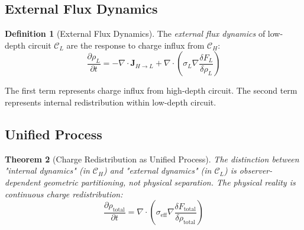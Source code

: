 \documentclass[12pt,a4paper]{article}
\theoremstyle{plain}
\newtheorem{theorem}{Theorem}[section]
\theoremstyle{definition}
\newtheorem{definition}[theorem]{Definition}
\theoremstyle{remark}
\begin{document}
\subsection{External Flux Dynamics}

\begin{definition}[External Flux Dynamics]
\label{def:external_dynamics}
The \emph{external flux dynamics} of low-depth circuit $\mathcal{C}_L$ are the response to charge influx from $\mathcal{C}_H$:
\begin{equation}
\frac{\partial \rho_L}{\partial t} = -\nabla \cdot \mathbf{J}_{H \to L} + \nabla \cdot \left( \sigma_L \nabla \frac{\delta F_L}{\delta \rho_L} \right)
\end{equation}
\end{definition}

The first term represents charge influx from high-depth circuit. The second term represents internal redistribution within low-depth circuit.

\subsection{Unified Process}

\begin{theorem}[Charge Redistribution as Unified Process]
\label{thm:unified_process}
The distinction between "internal dynamics" (in $\mathcal{C}_H$) and "external dynamics" (in $\mathcal{C}_L$) is observer-dependent geometric partitioning, not physical separation. The physical reality is continuous charge redistribution:
\begin{equation}
\frac{\partial \rho_{\text{total}}}{\partial t} = \nabla \cdot \left( \sigma_{\text{eff}} \nabla \frac{\delta F_{\text{total}}}{\delta \rho_{\text{total}}} \right)
\end{equation}
\end{theorem}
\end{document}
